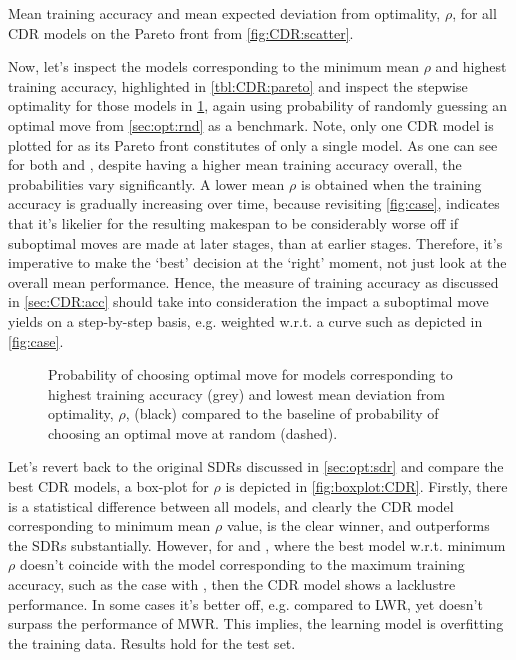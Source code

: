 \documentclass[smallextended]{svjour3}
\begin{document}
\begin{table}
\caption{Mean training accuracy and mean expected deviation from optimality, $\rho$, for all CDR models on the Pareto front from \cref{fig:CDR:scatter}.}\label{tbl:CDR:pareto}

\end{table}

Now, let's inspect the models corresponding to the minimum mean $\rho$ and highest training accuracy, highlighted in \cref{tbl:CDR:pareto} and inspect the stepwise optimality for those models in \cref{fig:CDR:opt}, again using probability of randomly guessing an optimal move from \cref{sec:opt:rnd} as a benchmark. Note, only one CDR model is plotted for   as its Pareto front constitutes of only a single model. As one can see for both  and , despite having a higher mean training accuracy overall, the probabilities vary significantly. A lower mean $\rho$ is obtained when the training accuracy is gradually increasing over time, because revisiting \cref{fig:case}, indicates that it's likelier for the resulting makespan to be considerably worse off if suboptimal moves are made at later stages, than at earlier stages. Therefore, it's imperative to make the `best' decision at the `right' moment, not just look at the overall mean performance. Hence, the measure of training accuracy as discussed in \cref{sec:CDR:acc} should take into consideration the impact a suboptimal move yields on a step-by-step basis, e.g. weighted w.r.t. a curve such as depicted in \cref{fig:case}.

\begin{figure}[p]
\centering
{}%
\caption{Probability of choosing optimal move for models corresponding to highest training accuracy (grey) and lowest mean deviation from optimality, $\rho$, (black) compared to the baseline of probability of choosing an optimal move at random (dashed).}
\label{fig:CDR:opt}
\end{figure}

Let's revert back to the original SDRs discussed in \cref{sec:opt:sdr} and compare the best CDR models, a box-plot for $\rho$ is depicted in \cref{fig:boxplot:CDR}. Firstly, there is a statistical difference between all models, and  clearly the CDR model corresponding to minimum mean $\rho$ value, is the clear winner, and outperforms the  SDRs substantially. However, for  and , where the best model w.r.t. minimum $\rho$ doesn't coincide with the model corresponding to the maximum training accuracy, such as the case with , then the CDR model shows a lacklustre performance. In some cases it's better off, e.g. compared to LWR, yet doesn't surpass the performance of MWR. This implies, the learning model is overfitting the training data. Results hold for the test set. 
\end{document}
